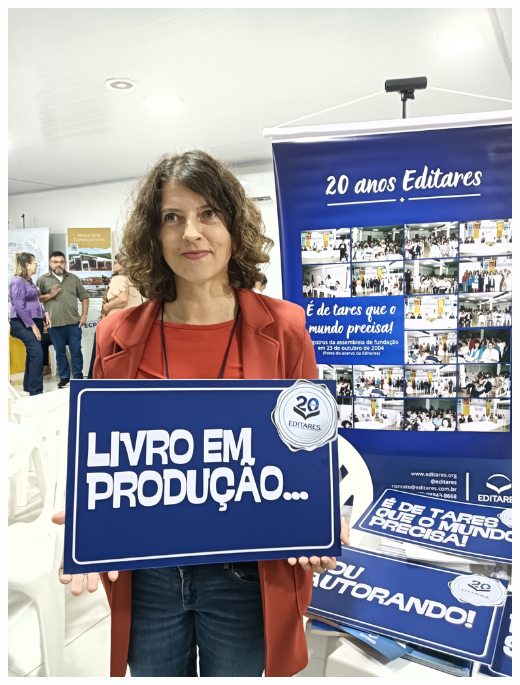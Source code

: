\documentclass{gescons}
\begin{document}
  \begin{minipage}[b]{0.32\textwidth}
    \includegraphics[width=\linewidth]{articles/resumo/fotos/materia2/IMG20241208144514.jpg}
  \end{minipage}
  
\end{document}
